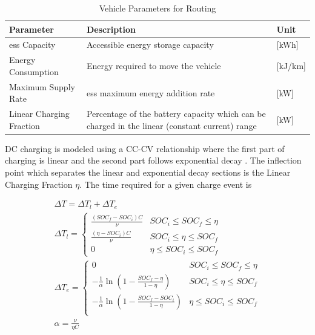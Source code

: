 \begin{table}[H]
	\centering
	\caption{Vehicle Parameters for Routing}
	\label{tab:param_veh}
	\begin{tabular}{|C{/8}|C{/8}|C{/8}|}
		\hline {} Parameter & Description & Unit \\
		\hline \gls{ess} Capacity & Accessible energy storage capacity & [kWh] \\
		\hline Energy Consumption & Energy required to move the vehicle & [kJ/km] \\
		\hline Maximum Supply Rate & \gls{ess} maximum energy addition rate & [kW] \\
		\hline Linear Charging Fraction & Percentage of the battery capacity which can be charged in the linear (constant current) range & [kW] \\
		\hline
	\end{tabular}
\end{table}

DC charging is modeled using a CC-CV relationship where the first part of charging is linear and the second part follows exponential decay \cite{Marra_2012}. The inflection point which separates the linear and exponential decay sections is the Linear Charging Fraction $\eta$. The time required for a given charge event is

\begin{gather}
	\Delta T = \Delta T_{l} + \Delta T_{e} \\
	\Delta T_{l} = \begin{cases}
		\frac{(SOC_f - SOC_i) C}{\nu} &  SOC_i \leq SOC_f \leq \eta \\
		\frac{(\eta - SOC_i) C}{\nu} &  SOC_i \leq \eta \leq SOC_f \\
		0 &  \eta \leq SOC_i \leq SOC_f
	\end{cases} \\
	\Delta T_{e} = \begin{cases}
		0 & SOC_i \leq SOC_f \leq \eta \\
		-\frac{1}{\alpha}\ln{\left(1-\frac{SOC_f - \eta}{1-\eta}\right)} &  SOC_i \leq \eta \leq SOC_f \\
		-\frac{1}{\alpha}\ln{\left(1-\frac{SOC_f - SOC_i}{1-\eta}\right)} &  \eta \leq SOC_i \leq SOC_f \\
	\end{cases} \\
	\alpha = \frac{\nu}{\eta C}
\end{gather}

